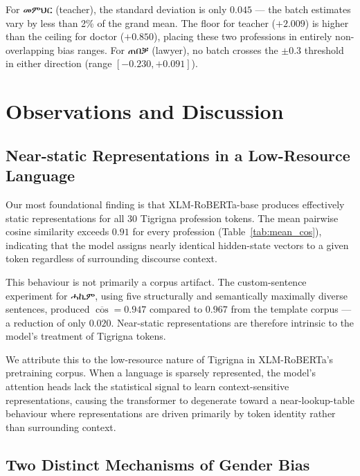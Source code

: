 \documentclass[11pt,a4paper]{article}
\begin{document}
For {\ethiopicfont መምህር} (teacher), the standard deviation is only $0.045$ — the
batch estimates vary by less than 2\% of the grand mean. The floor for teacher
($+2.009$) is higher than the ceiling for doctor ($+0.850$), placing these two
professions in entirely non-overlapping bias ranges. For
{\ethiopicfont ጠበቓ} (lawyer), no batch crosses the $\pm 0.3$ threshold in either
direction (range $[-0.230, +0.091]$).


\section{Observations and Discussion}

\subsection{Near-static Representations in a Low-Resource Language}

Our most foundational finding is that XLM-RoBERTa-base produces effectively
static representations for all 30 Tigrigna profession tokens. The mean pairwise
cosine similarity exceeds $0.91$ for every profession (Table~\ref{tab:mean_cos}),
indicating that the model assigns nearly identical hidden-state vectors to a
given token regardless of surrounding discourse context.

This behaviour is not primarily a corpus artifact. The custom-sentence
experiment for {\ethiopicfont ሓኪም}, using five structurally and semantically maximally
diverse sentences, produced $\overline{\cos} = 0.947$ compared to $0.967$ from
the template corpus — a reduction of only $0.020$. Near-static representations
are therefore intrinsic to the model's treatment of Tigrigna tokens.

We attribute this to the low-resource nature of Tigrigna in XLM-RoBERTa's
pretraining corpus. When a language is sparsely represented, the model's
attention heads lack the statistical signal to learn context-sensitive
representations, causing the transformer to degenerate toward a near-lookup-table
behaviour where representations are driven primarily by token identity rather
than surrounding context.

\subsection{Two Distinct Mechanisms of Gender Bias}
\end{document}
